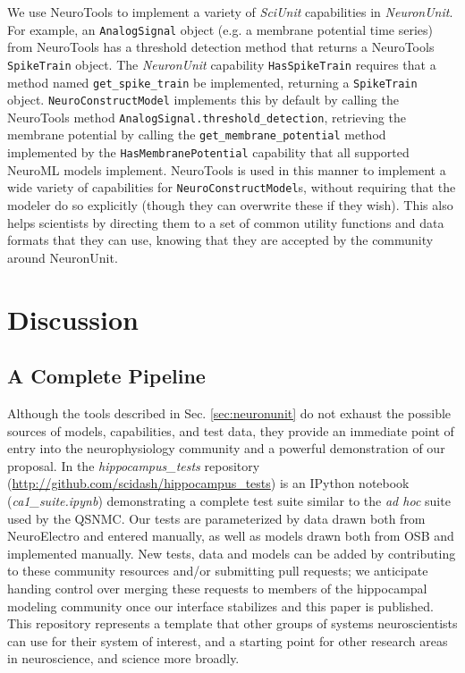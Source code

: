 \documentclass{frontiersSCNS}
\let\verbx\lstinline
\begin{document}
We use NeuroTools to implement a variety of \textit{SciUnit} capabilities in \textit{NeuronUnit}. 
For example, an \verbx{AnalogSignal} object (e.g. a membrane potential time series) from NeuroTools has a threshold detection method that returns a NeuroTools \verbx{SpikeTrain} object. 
The \textit{NeuronUnit} capability \verbx{HasSpikeTrain}  requires that a method named \verbx{get_spike_train} be implemented, returning a \verbx{SpikeTrain} object. 
\verbx{NeuroConstructModel} implements this by default by calling the NeuroTools method \verbx{AnalogSignal.threshold_detection}, retrieving the membrane potential by calling the \verbx{get_membrane_potential} method implemented by the \verbx{HasMembranePotential} capability that all supported NeuroML models implement.
NeuroTools is used in this manner to implement a wide variety of capabilities for \verbx{NeuroConstructModel}s, without requiring that the modeler do so explicitly (though they can overwrite these if they wish). 
This also helps scientists by directing them to a set of common utility functions and data formats that they can use, knowing that they are accepted by the community around NeuronUnit.

\section{Discussion}\label{sec:discussion}

\subsection{A Complete Pipeline}
Although the tools described in Sec. \ref{sec:neuronunit} do not exhaust the possible sources of models, capabilities, and test data, they provide an immediate point of entry into the neurophysiology community and a powerful demonstration of our proposal. 
In the \textit{hippocampus\_tests} repository (\url{http://github.com/scidash/hippocampus\_tests}) is an IPython notebook (\textit{ca1\_suite.ipynb}) demonstrating a complete test suite similar to the \emph{ad hoc} suite used by the QSNMC. Our tests are parameterized by data drawn both from NeuroElectro and entered manually, as well as models drawn both from OSB and implemented manually. New tests, data and models can be added by contributing to these community resources and/or submitting pull requests; we anticipate handing control over merging these requests to members of the hippocampal modeling community once our interface stabilizes and this paper is published. This repository represents a template that other groups of systems neuroscientists can use for their system of interest, and a starting point for other research areas in neuroscience, and science more broadly.
\end{document}

